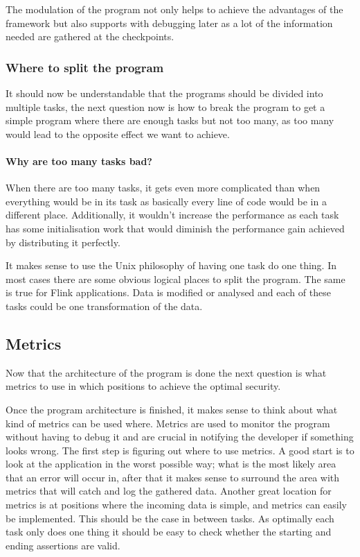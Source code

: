 The modulation of the program not only helps to achieve the advantages of the framework but also supports with debugging later as a lot of the information needed are gathered at the checkpoints.

\subsubsection{Where to split the program}
It should now be understandable that the programs should be divided into multiple tasks, the next question now is how to break the program to get a simple program where there are enough tasks but not too many, as too many would lead to the opposite effect we want to achieve.

\paragraph{Why are too many tasks bad?} When there are too many tasks, it gets even more complicated than when everything would be in its task as basically every line of code would be in a different place. Additionally, it wouldn't increase the performance as each task has some initialisation work that would diminish the performance gain achieved by distributing it perfectly.

It makes sense to use the Unix philosophy of having one task do one thing. In most cases there are some obvious logical places to split the program. The same is true for Flink applications. Data is modified or analysed and each of these tasks could be one transformation of the data.

\subsection{Metrics}
Now that the architecture of the program is done the next question is what metrics to use in which positions to achieve the optimal security.

Once the program architecture is finished, it makes sense to think about what kind of metrics can be used where. Metrics are used to monitor the program without having to debug it and are crucial in notifying the developer if something looks wrong. The first step is figuring out where to use metrics. A good start is to look at the application in the worst possible way; what is the most likely area that an error will occur in, after that it makes sense to surround the area with metrics that will catch and log the gathered data. Another great location for metrics is at positions where the incoming data is simple, and metrics can easily be implemented. This should be the case in between tasks. As optimally each task only does one thing it should be easy to check whether the starting and ending assertions are valid.

